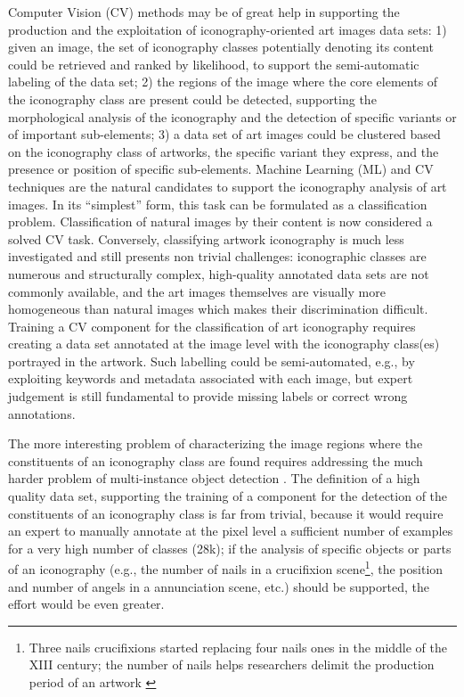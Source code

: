 \documentclass[acmlarge]{acmart}
\newcommand{\quoted}[1]{``#1''}
\begin{document}
Computer Vision (CV) methods may be of great help in supporting the production and the exploitation  of iconography-oriented art images data sets: 1) given an image, the set of iconography classes potentially denoting its content could be retrieved and ranked by likelihood, to support the semi-automatic labeling of the data set; 2) the regions of the image where the core elements of the iconography class are present could be detected, supporting the morphological analysis of the iconography and the detection of specific variants    or of important sub-elements; 3) a data set of art images could be clustered based on the iconography class of artworks, the specific variant they express, and the presence or position of specific sub-elements. 
Machine Learning (ML) and CV techniques are the natural candidates to support the iconography analysis of art images. 
In its \quoted{simplest} form, this task can be formulated as a classification problem. Classification of natural images by their content is now considered a solved CV task. Conversely, classifying artwork iconography is much less investigated and still presents non trivial challenges: iconographic classes are numerous and structurally complex, high-quality annotated data sets are not commonly available, and the art images themselves are visually more homogeneous than natural images which makes their discrimination difficult. 
Training a CV component for the classification of art iconography requires creating a data set annotated at the image level with the iconography class(es) portrayed in the artwork.
Such labelling could be semi-automated, e.g., by exploiting keywords and metadata associated with each image, but  expert judgement is still fundamental to provide missing labels  or correct wrong annotations. 

The more interesting problem of characterizing the image regions where the constituents of an iconography class are found requires addressing the much harder problem of multi-instance object detection \cite{lin2014microsoft}.
The definition of a high quality  data set, supporting the training of a component for the detection of the constituents of an iconography class is far from trivial, because it would require an expert to  manually annotate at the pixel level  a sufficient number of examples for a very high number of classes (28k); if the analysis of specific objects or parts of an iconography (e.g., the number of nails in a crucifixion scene\footnote{Three nails crucifixions started replacing four nails ones in the middle of the XIII century; the number of nails helps researchers  delimit the production period of an artwork \cite{heinz71}}, the position and number of angels in a annunciation scene, etc.)  should be supported, the effort would be even greater. 
\end{document}
